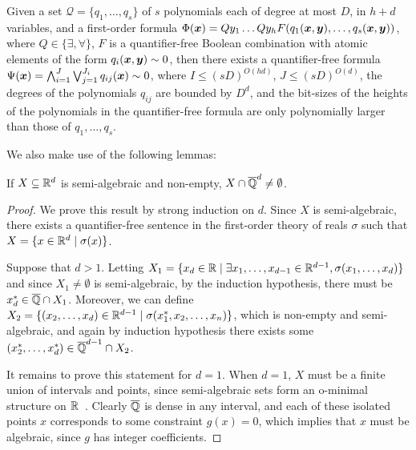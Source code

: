 \begin{theorem}
\label{thm:quant-elim}
  Given a set $\mathcal{Q}=\lbrace q_1,\ldots,q_s\rbrace$ of $s$   polynomials each of degree at most $D$, in $h+d$ variables, and a   first-order formula $\Phi(\boldsymbol x)=Q y_1 \ldots Q y_h   F(q_1(\boldsymbol x,\boldsymbol y),\ldots,q_s(\boldsymbol x,\boldsymbol y))$, where $Q\in\lbrace \exists,\forall\rbrace$, $F$ is a quantifier-free Boolean combination with atomic elements of the form $q_i(\boldsymbol x,\boldsymbol y)\sim 0$, then there exists a quantifier-free formula $\Psi(\boldsymbol{x}) = \bigwedge_{i=1}^{J} \bigvee_{j=1}^{J_i} q_{ij}(\boldsymbol{x}) \sim 0$,
  where $I\leq (sD)^{O(hd)}$, $J\leq (sD)^{O(d)}$, the degrees of the   polynomials $q_{ij}$ are bounded by $D^{d}$, and the bit-sizes of the   heights of the polynomials in the quantifier-free formula are only   polynomially larger than those of $q_1,\ldots,q_s$.
\end{theorem}

We also make use of the following lemmas:
\begin{lemma}
  If $X\subseteq\mathbb{R}^{d}$ is semi-algebraic and non-empty,
  $X\cap\overline{\mathbb{Q}}^{d}\neq\emptyset$.
\end{lemma}

\begin{proof}
  We prove this result by strong induction on $d$. Since $X$ is
  semi-algebraic, there exists a quantifier-free sentence in the
  first-order theory of reals $\sigma$ such that $X=\lbrace
  x\in\mathbb{R}^{d}\mid \sigma(x)\rbrace$.

  Suppose that $d>1$. Letting $X_1=\lbrace x_d\in\mathbb{R}\mid
  \exists
  x_1,\ldots,x_{d-1}\in\mathbb{R}^{d-1},\sigma(x_1,\ldots,x_d)\rbrace$
  and since $X_1\neq\emptyset$ is semi-algebraic, by the induction
  hypothesis, there must be $x_d^*\in\overline{\mathbb{Q}}\cap X_1$. Moreover, we
  can define $X_2=\lbrace (x_2,\ldots,x_d)\in\mathbb{R}^{d-1}\mid
  \sigma(x_1^*,x_2,\ldots,x_n)\rbrace$, which is non-empty and
  semi-algebraic, and again by induction hypothesis there exists some
  $(x_2^*,\ldots,x_d^*)\in\overline{\mathbb{Q}}^{d-1}\cap X_2$.

  It remains to prove this statement for $d=1$. When $d=1$, $X$ must
  be a finite union of intervals and points, since semi-algebraic sets
  form an o-minimal structure on $\mathbb{R}$~\cite{Tar51}. Clearly
  $\overline{\mathbb{Q}}$ is dense in any interval, and each of these isolated
  points $x$ corresponds to some constraint $g(x)=0$, which implies
  that $x$ must be algebraic, since $g$ has integer coefficients.
\end{proof}

